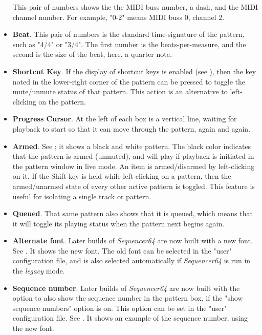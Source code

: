 \begin{itemize}
         This pair of numbers shows the the MIDI buss number, a dash, and
         the MIDI channel number.
         For example, "0-2" means MIDI buss 0, channel 2.
      \item \textbf{Beat}.
         This pair of numbers is the standard time-signature of the pattern,
         such as "4/4" or "3/4".  The first number is the beats-per-measure,
         and the second is the size of the beat, here, a quarter note.
      \item \textbf{Shortcut Key}.
         If the display of shortcut keys is enabled (see
         ),
         then the key noted in the lower-right corner of the pattern can be
         pressed to toggle the mute/unmute status of that pattern.
         This action is an alternative to left-clicking on the pattern.
      \item \textbf{Progress Cursor}.
         At the left of each box is a vertical line, waiting for playback to
         start so that it can move through the pattern, again and again.
      \item \textbf{Armed}.
         See ; it shows a black
         and white pattern.  The black color indicates that the pattern is armed
         (unmuted), and will play if playback is initiated in the pattern
         window in live mode.
         An item is armed/disarmed by left-clicking on it.
         If the Shift key is held while left-clicking on a pattern, then
         the armed/unarmed state of every other active pattern is toggled.
         This feature is useful for isolating a single track or pattern.
      \item \textbf{Queued}.
         That same pattern also shows that it is queued, which means that it
         will toggle its playing status when the pattern next begins again.
      \item \textbf{Alternate font}.
         Later builds of \textsl{Sequencer64} are now built with a new font.
         See .  It shows the new
         font. 
         The old font can be selected in the "user" configuration file, and is
         also selected automatically if \textsl{Sequencer64} is run in the
         \textsl{legacy} mode.
      \item \textbf{Sequence number}.
         Later builds of \textsl{Sequencer64} are now built with the option to
         also show the sequence number in the pattern box, if the "show
         sequence numbers" option is on.
         This option can be set in the "user" configuration file.
         See .  It shows an
         example of the sequence number, using the new font.
   \end{itemize}


